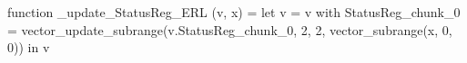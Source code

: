 function _update_StatusReg_ERL (v, x) = let v = { v with StatusReg_chunk_0 = vector_update_subrange(v.StatusReg_chunk_0, 2, 2, vector_subrange(x, 0, 0)) } in v
